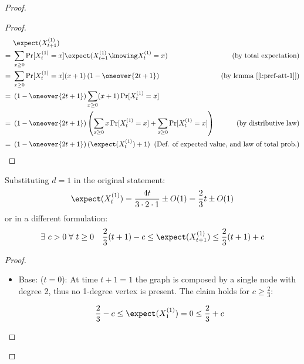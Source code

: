 \begin{proof}
    \begin{proof}
        \begin{align*}
             &\ \expect(X_{t + 1}^{(1)})                                                            & \\
            =&\ \sum_{x \geq 0} \Pr[X_t^{(1)} = x] \expect(X_{t + 1}^{(1)} \knowing X_t^{(1)} = x)  & \text{(by total expectation)} \\
            =&\ \sum_{x \geq 0} \Pr[X_t^{(1)} = x] (x + 1) \left( 1 - \oneover{2t + 1} \right)      & \text{(by lemma [\ref{l:pref-att-1}])} \\
            =&\ \left( 1 - \oneover{2t + 1} \right) \sum_{x \geq 0} (x + 1) \Pr[X_t^{(1)} = x]      & \\
            =&\ \left( 1 - \oneover{2t + 1} \right) \left( \sum_{x \geq 0} x \Pr[X_t^{(1)} = x] + \sum_{x \geq 0} \Pr[X_t^{(1)} = x] \right)    & \text{(by distributive law)} \\
            =&\ \left( 1 - \oneover{2t + 1} \right) (\expect(X_t^{(1)}) + 1)                        & \mathllap{\text{(Def. of expected value, and law of total prob.)}}
        \end{align*}
    \end{proof}

    \begin{lemma}\label{l:pref-att-3} Substituting $d = 1$ in the original statement:
        \[
            \expect(X_t^{(1)}) = \frac{4 t}{3 \cdot 2 \cdot 1} \pm O(1) = \frac{2}{3} t \pm O(1)
        \]
        or in a different formulation:
        \[
            \exists\ c > 0\; \forall\ t\geq 0 \quad \frac{2}{3} (t + 1) - c \leq \expect( X_{t + 1}^{(1)} ) \leq \frac{2}{3} (t + 1) + c
        \]
    \end{lemma}

    \begin{proof}

        \begin{itemize}
            \item Base: ($t = 0$): At time $t + 1 = 1$ the graph is composed by a single node with degree 2, thus no 1-degree vertex is present. The claim holds for $c \geq \frac{2}{3}$:

            \[
                \frac{2}{3} - c \leq \expect(X_1^{(1)}) = 0 \leq \frac{2}{3} + c
            \]


\end{itemize}
\end{proof}
\end{proof}

